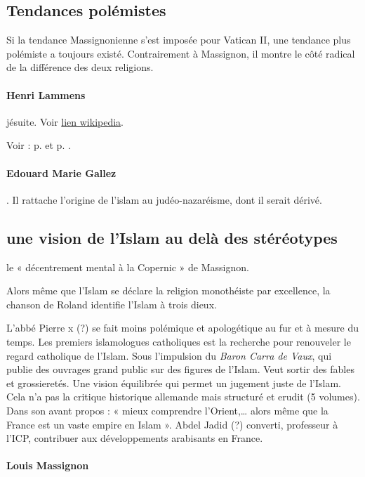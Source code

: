 \subsection{Tendances polémistes}
Si la tendance Massignonienne s’est imposée pour Vatican II, une tendance plus polémiste a toujours existé. Contrairement à Massignon, il montre le côté radical de la différence des deux religions.  
\paragraph{Henri Lammens} jésuite. Voir \href{https://fr.wikipedia.org/wiki/Henri_Lammens}{lien wikipedia}.

Voir : p. \pageref{Theol:Lammens2} et p. \pageref{Lammens1}.
\paragraph{Edouard Marie Gallez}. Il rattache l'origine de l'islam au judéo-nazaréisme, dont il serait dérivé.

\subsection{une vision de l’Islam au delà des stéréotypes}

 le  « décentrement mental à la Copernic » de Massignon. 
\begin{Ex}
Alors même que l’Islam se déclare la religion monothéiste par excellence, la chanson de Roland identifie l’Islam à trois dieux. 
\end{Ex}
L’abbé Pierre x (?) se fait moins polémique et apologétique au fur et à mesure du temps. Les premiers islamologues catholiques est la recherche pour renouveler le regard catholique de l’Islam. Sous l’impulsion du \emph{ Baron Carra de Vaux}, qui publie des ouvrages grand public sur des figures de l’Islam. Veut sortir des fables et grossieretés. Une vision équilibrée qui permet un jugement juste de l’Islam. Cela n’a pas la critique historique allemande mais structuré et erudit (5 volumes).  Dans son avant propos : « mieux comprendre l’Orient,… alors même que la France est un vaste empire en Islam ».  Abdel Jadid (?) converti, professeur à l’ICP, contribuer aux développements arabisants en France. 

\paragraph{Louis Massignon}

